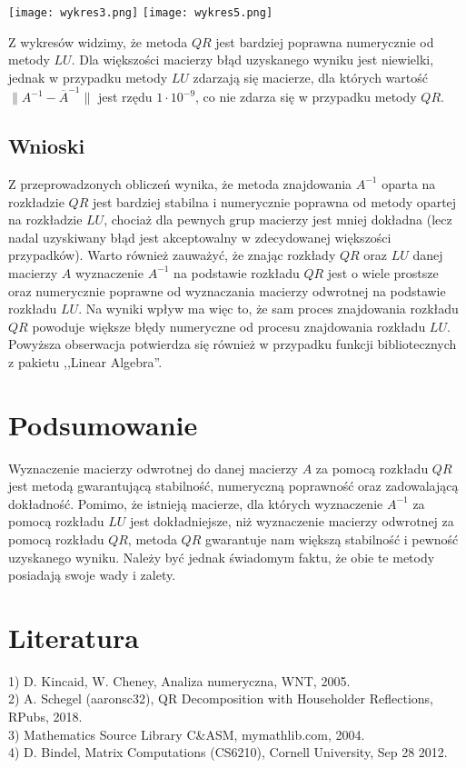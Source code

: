 \documentclass[11pt]{article}
\begin{document}
\begin{center}
\texttt{[image: wykres3.png]}
\texttt{[image: wykres5.png]}
\end{center}
Z wykresów widzimy, że metoda $QR$ jest bardziej poprawna numerycznie od metody $LU$. Dla większości macierzy błąd uzyskanego wyniku jest niewielki, jednak w przypadku metody $LU$ zdarzają się macierze, dla których wartość $ \|  A^{-1} - \overline{A}^{-1} \| $ jest rzędu $1 \cdot 10^{-9}$, co nie zdarza się w przypadku metody $QR$.

\subsection{Wnioski}

Z przeprowadzonych obliczeń wynika, że metoda znajdowania $A^{-1}$ oparta na rozkładzie $QR$ jest bardziej stabilna i numerycznie poprawna od metody opartej na rozkładzie $LU$, chociaż dla pewnych grup macierzy jest mniej dokładna (lecz nadal uzyskiwany błąd jest akceptowalny w zdecydowanej większości przypadków). Warto również zauważyć, że znając rozkłady $QR$ oraz $LU$ danej macierzy $A$ wyznaczenie $A^{-1}$ na podstawie rozkładu $QR$ jest o wiele prostsze oraz numerycznie poprawne od wyznaczania macierzy odwrotnej na podstawie rozkładu $LU$. Na wyniki wpływ ma więc to, że sam proces znajdowania rozkładu $QR$ powoduje większe błędy numeryczne od procesu znajdowania rozkładu $LU$. Powyższa obserwacja potwierdza się również w przypadku funkcji bibliotecznych z pakietu ,,Linear Algebra''. 

\section{Podsumowanie}

Wyznaczenie macierzy odwrotnej do danej macierzy $A$ za pomocą rozkładu $QR$ jest metodą gwarantującą stabilność, numeryczną poprawność oraz zadowalającą dokładność. Pomimo, że istnieją macierze, dla których wyznaczenie $A^{-1}$ za pomocą rozkładu $LU$ jest dokładniejsze, niż wyznaczenie macierzy odwrotnej za pomocą rozkładu $QR$, metoda $QR$ gwarantuje nam większą stabilność i pewność uzyskanego wyniku. Należy być jednak świadomym faktu, że obie te metody posiadają swoje wady i zalety.

\section{Literatura}

1) D. Kincaid, W. Cheney, Analiza numeryczna, WNT, 2005.\\
2) A. Schegel (aaronsc32), QR Decomposition with Householder Reflections, RPubs, 2018.\\
3) Mathematics Source Library C\&ASM, mymathlib.com, 2004.\\
4) D. Bindel, Matrix Computations (CS6210), Cornell University, Sep 28 2012.\\ 


	 
\end{document}
